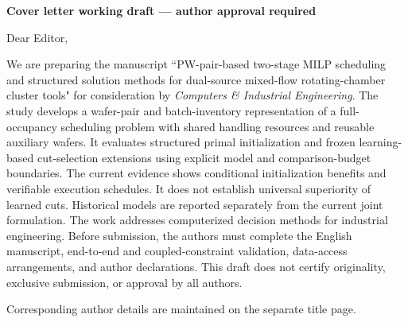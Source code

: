 \documentclass[11pt]{article}
\begin{document}
\noindent\textbf{Cover letter working draft --- author approval required}\par
\bigskip
Dear Editor,\par
We are preparing the manuscript ``PW-pair-based two-stage MILP scheduling and structured solution methods for dual-source mixed-flow rotating-chamber cluster tools" for consideration by \textit{Computers \& Industrial Engineering}.
The study develops a wafer-pair and batch-inventory representation of a full-occupancy scheduling problem with shared handling resources and reusable auxiliary wafers. It evaluates structured primal initialization and frozen learning-based cut-selection extensions using explicit model and comparison-budget boundaries.
The current evidence shows conditional initialization benefits and verifiable execution schedules. It does not establish universal superiority of learned cuts. Historical models are reported separately from the current joint formulation.
The work addresses computerized decision methods for industrial engineering. Before submission, the authors must complete the English manuscript, end-to-end and coupled-constraint validation, data-access arrangements, and author declarations. This draft does not certify originality, exclusive submission, or approval by all authors.\par
\bigskip
Corresponding author details are maintained on the separate title page.
\end{document}

